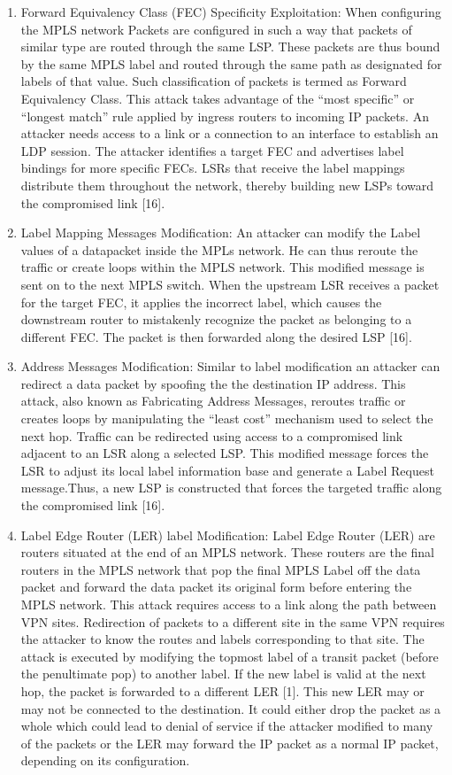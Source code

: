 \begin{enumerate}
\item Forward Equivalency Class (FEC) Specificity Exploitation:
When configuring the MPLS network Packets are configured in such a way that packets of similar type are routed through the same LSP. These packets are thus bound by the same MPLS label and routed through the same path as designated for labels of that value. Such classification of packets is termed as Forward Equivalency Class. This attack takes advantage of the “most specific” or “longest match” rule applied by ingress routers to incoming IP
packets. An attacker needs access to a link or a connection to an interface to establish an LDP session. The attacker identifies a target FEC and
advertises label bindings for more specific FECs. LSRs that receive the label mappings distribute them throughout the network, thereby building
new LSPs toward the compromised link [16].

\item Label Mapping Messages Modification:
An attacker can modify the Label values of a datapacket inside the MPLs network. He can thus reroute the traffic or create loops within the MPLS network. This modified message is sent on to the next MPLS switch. When the upstream LSR receives a packet for the target FEC, it applies the incorrect
label, which causes the downstream router to mistakenly recognize the packet as belonging to a different FEC. The packet is then forwarded
along the desired LSP [16].

\item Address Messages Modification:
Similar to label modification an attacker can redirect a data packet by spoofing the the destination IP address. This attack, also known as Fabricating Address Messages, reroutes traffic or creates loops by manipulating the “least cost” mechanism used to select the next hop. Traffic can be redirected using access to a compromised link adjacent to an LSR along a selected LSP. This modified message forces the LSR to adjust its local label information base and generate a Label Request message.Thus, a new LSP is constructed that forces the targeted traffic along the compromised link [16].

\item Label Edge Router (LER) label Modification:
Label Edge Router (LER) are routers situated at the end of an MPLS network. These routers are the final routers in the MPLS network that pop the final MPLS Label off the data packet and forward the data packet its original form before entering the MPLS network. This attack requires access to a link
along the path between VPN sites. Redirection of packets to a different site in the same VPN requires the attacker to know the routes and labels corresponding to that site. The attack is executed by modifying the topmost label of a transit packet (before the penultimate pop) to another label. If the new label is valid at the next hop, the packet is forwarded to a different LER [1]. This new LER may or may not be connected to the destination. It could either drop the packet as a whole which could lead to denial of service if the attacker modified to many of the packets or the LER may forward the IP packet as a normal IP packet, depending on its configuration.


\end{enumerate}

